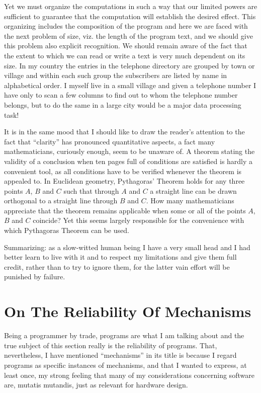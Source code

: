 Yet we must organize the computations in such a way that our limited powers are sufficient to guarantee that the computation will establish the desired effect. This organizing includes the composition of the program and here we are faced with the next problem of size, viz. the length of the program text, and we should give this problem also explicit recognition. We should remain aware of the fact that the extent to which we can read or write a text is very much dependent on its size. In my country the entries in the telephone directory are grouped by town or village and within each such group the subscribers are listed by name in alphabetical order. I myself live in a small village and given a telephone number I have only to scan a few columns to find out to whom the telephone number belongs, but to do the same in a large city would be a major data processing task!

It is in the same mood that I should like to draw the reader's attention to the fact that ``clarity'' has pronounced quantitative aspects, a fact many mathematicians, curiously enough, seem to be unaware of. A theorem stating the validity of a conclusion when ten pages full of conditions are satisfied is hardly a convenient tool, as all conditions have to be verified whenever the theorem is appealed to. In Euclidean geometry, Pythagoras' Theorem holds for any three points $A$, $B$ and $C$ such that through $A$ and $C$ a straight line can be drawn orthogonal to a straight line through $B$ and $C$. How many mathematicians appreciate that the theorem remains applicable when some or all of the points $A$, $B$ and $C$ coincide? Yet this seems largely responsible for the convenience with which Pythagoras Theorem can be used.

Summarizing: as a slow-witted human being I have a very small head and I had better learn to live with it and to respect my limitations and give them full credit, rather than to try to ignore them, for the latter vain effort will be punished by failure.

\section{On The Reliability Of Mechanisms}

Being a programmer by trade, programs are what I am talking about and the true subject of this section really is the reliability of programs. That, nevertheless, I have mentioned ``mechanisms'' in its title is because I regard programs as specific instances of mechanisms, and that I wanted to express, at least once, my strong feeling that many of my considerations concerning software are, mutatis mutandis, just as relevant for hardware design.

